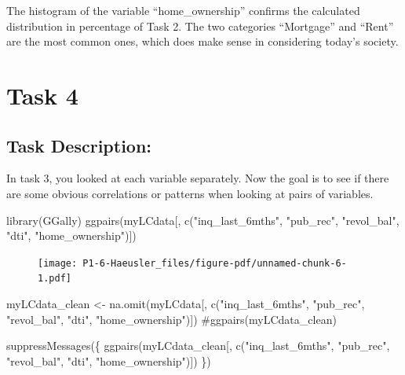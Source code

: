 \documentclass[
  letterpaper,
  DIV=11,
  numbers=noendperiod]{scrartcl}
\newenvironment{Shaded}{\begin{snugshade}}{\end{snugshade}}
\newcommand{\CommentTok}[1]{\textcolor[rgb]{0.37,0.37,0.37}{#1}}
\newcommand{\FunctionTok}[1]{\textcolor[rgb]{0.28,0.35,0.67}{#1}}
\newcommand{\NormalTok}[1]{\textcolor[rgb]{0.00,0.23,0.31}{#1}}
\newcommand{\OtherTok}[1]{\textcolor[rgb]{0.00,0.23,0.31}{#1}}
\newcommand{\StringTok}[1]{\textcolor[rgb]{0.13,0.47,0.30}{#1}}
\begin{document}
The histogram of the variable ``home\_ownership'' confirms the
calculated distribution in percentage of Task 2. The two categories
``Mortgage'' and ``Rent'' are the most common ones, which does make
sense in considering today's society.

\hypertarget{task-4}{%
\section{Task 4}\label{task-4}}

\hypertarget{task-description-3}{%
\subsection{Task Description:}\label{task-description-3}}

In task 3, you looked at each variable separately. Now the goal is to
see if there are some obvious correlations or patterns when looking at
pairs of variables.

\begin{Shaded}
\begin{Highlighting}[]
\FunctionTok{library}\NormalTok{(GGally)}
\FunctionTok{ggpairs}\NormalTok{(myLCdata[, }\FunctionTok{c}\NormalTok{(}\StringTok{"inq\_last\_6mths"}\NormalTok{, }\StringTok{"pub\_rec"}\NormalTok{, }\StringTok{"revol\_bal"}\NormalTok{, }\StringTok{"dti"}\NormalTok{, }\StringTok{"home\_ownership"}\NormalTok{)])}
\end{Highlighting}
\end{Shaded}

\begin{figure}[H]

{\centering \texttt{[image: P1-6-Haeusler\_files/figure-pdf/unnamed-chunk-6-1.pdf]}

}

\end{figure}

\begin{Shaded}
\begin{Highlighting}[]
\NormalTok{myLCdata\_clean }\OtherTok{\textless{}{-}} \FunctionTok{na.omit}\NormalTok{(myLCdata[, }\FunctionTok{c}\NormalTok{(}\StringTok{"inq\_last\_6mths"}\NormalTok{, }\StringTok{"pub\_rec"}\NormalTok{, }\StringTok{"revol\_bal"}\NormalTok{, }\StringTok{"dti"}\NormalTok{, }\StringTok{"home\_ownership"}\NormalTok{)])}
\CommentTok{\#ggpairs(myLCdata\_clean)}

\FunctionTok{suppressMessages}\NormalTok{(\{}
  \FunctionTok{ggpairs}\NormalTok{(myLCdata\_clean[, }\FunctionTok{c}\NormalTok{(}\StringTok{"inq\_last\_6mths"}\NormalTok{, }\StringTok{"pub\_rec"}\NormalTok{, }\StringTok{"revol\_bal"}\NormalTok{, }\StringTok{"dti"}\NormalTok{, }\StringTok{"home\_ownership"}\NormalTok{)])}
\NormalTok{\})}
\end{Highlighting}
\end{Shaded}
\end{document}
